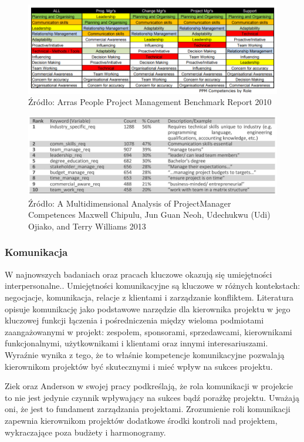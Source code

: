 \begin{figure}
\centering
\includegraphics[width=14cm]{img/kompetencje.png}
\caption{Źródło: Arras People Project Management Benchmark Report 2010 }
\end{figure}

\begin{figure}
\centering
\includegraphics[width=14cm]{img/kompetencje2.png}
\caption{Źródło: A Multidimensional Analysis of ProjectManager Competences Maxwell Chipulu, Jun Guan Neoh, Udechukwu (Udi) Ojiako, and Terry Williams 2013}
\end{figure}

\subsubsection{Komunikacja}
W najnowszych badaniach oraz pracach kluczowe okazują się umiejętności interpersonalne.\autocite{brill}. Umiejętności komunikacyjne są kluczowe w różnych kontekstach: negocjacje, komunikacja, relacje z klientami i zarządzanie konfliktem. Literatura opisuje komunikację jako podstawowe narzędzie dla kierownika projektu w jego kluczowej funkcji łączenia i pośredniczenia między wieloma podmiotami zaangażowanymi w projekt: zespołem, sponsorami, sprzedawcami, kierownikami funkcjonalnymi, użytkownikami i klientami oraz innymi interesariuszami. Wyraźnie wynika z tego, że to właśnie kompetencje komunikacyjne pozwalają kierownikom projektów być skutecznymi i mieć wpływ na sukces projektu. \autocite{Alvarenga}

Ziek oraz Anderson w swojej pracy podkreślają, że rola komunikacji w projekcie to nie jest jedynie czynnik wpływający na sukces bądź porażkę projektu. Uważają oni, że jest to fundament zarządzania projektami. Zrozumienie roli komunikacji zapewnia kierownikom projektów dodatkowe środki kontroli nad projektem, wykraczające poza budżety i harmonogramy.\autocite{ziek}

